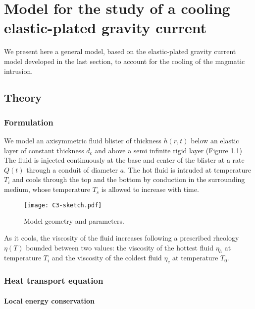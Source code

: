 \chapter{Model  for  the study  of  a  cooling elastic-plated  gravity
  current}
\label{chap3}
\minitoc

We present here  a general model, based on  the elastic-plated gravity
current  model developed  in  the  last section,  to  account for  the
cooling of the magmatic intrusion.

\section{Theory}
\label{C3-sec:theory}

\subsection{Formulation}
\label{C3-sec:formulation}

We model an axisymmetric fluid  blister of thickness $h(r,t)$ below an
elastic layer  of constant thickness  $d_c$ and above a  semi infinite
rigid layer \citep{Michaut:2011kg}  (Figure \ref{C3-sketch}) The fluid
is injected  continuously at the base  and center of the  blister at a
rate $Q(t)$  through a  conduit of  diameter $a$.  The hot  fluid is
intruded at temperature $T_i$ and cools through the top and the bottom
by conduction  in the surrounding  medium, whose temperature  $T_s$ is
allowed to increase with time.

\begin{figure}[htbp]
  \begin{center}
    \graphicspath{ {/Users/thorey/Documents/These/Manuscript/Figure/Chapter3/} }
    \texttt{[image: C3-sketch.pdf]}
    \caption{Model geometry and parameters.}
    \label{C3-sketch}
  \end{center}
\end{figure}

As  it  cools,  the  viscosity  of the  fluid  increases  following  a
prescribed  rheology   $\eta(T)$  bounded  between  two   values:  the
viscosity of the  hottest fluid $\eta_h$ at temperature  $T_i$ and the
viscosity of the coldest fluid $\eta_c$ at temperature $T_0$.
\subsection{Heat transport equation}

\subsubsection{Local energy conservation}\\

